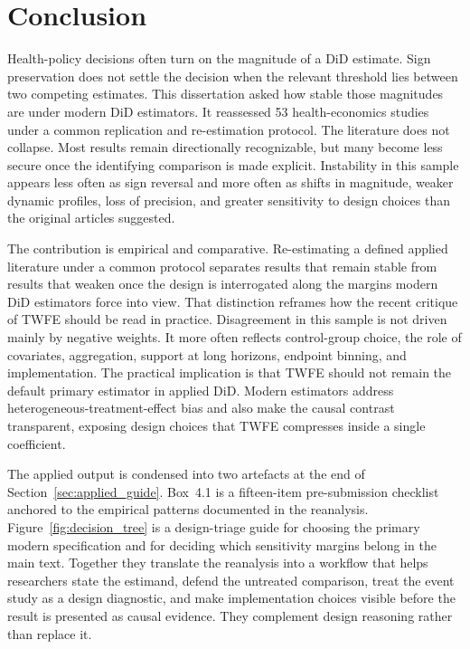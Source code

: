 \chapter{Conclusion}
\label{Chapter5}


Health-policy decisions often turn on the magnitude of a DiD estimate. Sign preservation does not settle the decision when the relevant threshold lies between two competing estimates. This dissertation asked how stable those magnitudes are under modern DiD estimators. It reassessed 53 health-economics studies under a common replication and re-estimation protocol. The literature does not collapse. Most results remain directionally recognizable, but many become less secure once the identifying comparison is made explicit. Instability in this sample appears less often as sign reversal and more often as shifts in magnitude, weaker dynamic profiles, loss of precision, and greater sensitivity to design choices than the original articles suggested.

The contribution is empirical and comparative. Re-estimating a defined applied literature under a common protocol separates results that remain stable from results that weaken once the design is interrogated along the margins modern DiD estimators force into view. That distinction reframes how the recent critique of TWFE should be read in practice. Disagreement in this sample is not driven mainly by negative weights. It more often reflects control-group choice, the role of covariates, aggregation, support at long horizons, endpoint binning, and implementation. The practical implication is that TWFE should not remain the default primary estimator in applied DiD. Modern estimators address heterogeneous-treatment-effect bias and also make the causal contrast transparent, exposing design choices that TWFE compresses inside a single coefficient.

The applied output is condensed into two artefacts at the end of Section~\ref{sec:applied_guide}. Box~4.1 is a fifteen-item pre-submission checklist anchored to the empirical patterns documented in the reanalysis. Figure~\ref{fig:decision_tree} is a design-triage guide for choosing the primary modern specification and for deciding which sensitivity margins belong in the main text. Together they translate the reanalysis into a workflow that helps researchers state the estimand, defend the untreated comparison, treat the event study as a design diagnostic, and make implementation choices visible before the result is presented as causal evidence. They complement design reasoning rather than replace it.

